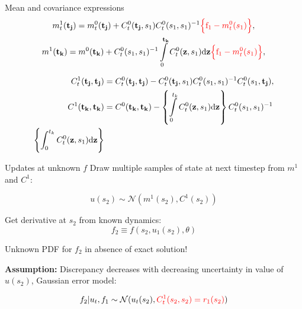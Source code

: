 \documentclass[usenames,dvipsnames]{beamer}
\theoremstyle{definition}
\begin{document}
\begin{frame}{Mean and covariance expressions}
    $$\begin{gathered}
        m_t^1(\mathbf{t_j}) =m_t^0(\mathbf{t_j})+C_t^0(\mathbf{t_j},s_1)C_t^0(s_1,s_1)^{-1}\textcolor{red}{\left\{\text{f}_1-m_t^0(s_1)\right\}}, \\
        m^1(\mathbf{t_k}) =m^0(\mathbf{t_k})+C_t^0(s_1,s_1)^{-1}\intop_0^\mathbf{t_k}C_t^0(\mathbf{z},s_1)\mathrm{d}\mathbf{z}\textcolor{red}{\left\{\mathrm{f}_1-m_t^0(s_1)\right\}}, 
        \end{gathered}$$

        $$\begin{aligned}
            C_t^1(\mathbf{t_j},\mathbf{t_j})& =C_t^0(\mathbf{t_j},\mathbf{t_j})-C_t^0(\mathbf{t_j},s_1)C_t^0(s_1,s_1)^{-1}C_t^0(s_1,\mathbf{t_j}),  \\
            C^1(\mathbf{t_k},\mathbf{t_k})& =C^0(\mathbf{t_k},\mathbf{t_k})-\left\{\intop_0^{t_k} C_t^0(\mathbf{z},s_1)\mathrm{d}\mathbf{z}\right\}C_t^0(s_1,s_1)^{-1}\\\left \{\int_0^{t_k}C_t^0(\mathbf{z},s_1)\mathrm{d}\mathbf{z}\right \}
        \end{aligned}$$
    
\end{frame}

\begin{frame}{Updates at unknown $f$}
Draw multiple samples of state at next timestep from $m^1$ and $C^1$:

$$u(s_2) \sim \mathcal{N}(m^1(s_2), C^1(s_2))$$

Get derivative at $s_2$ from known dynamics:
$$f_2 \equiv f(s_2, u_1(s_2), \theta)$$

Unknown PDF for $f_2$ in absence of exact solution!

\textbf{Assumption: } Discrepancy decreases with decreasing uncertainty in value of $u(s_2)$, Gaussian error model:

$$f_2 | u_t, f_1 \sim \mathcal{N}(u_t(s_2), \textcolor{red}{C_t^1(s_2, s_2)=r_1(s_2)})$$


\end{frame}
\end{document}
